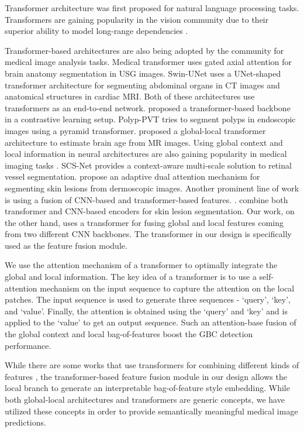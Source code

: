 %
Transformer architecture was first proposed \cite{vaswani2017attention} for natural language processing tasks. Transformers are gaining popularity in the vision community due to their superior ability to model long-range dependencies \cite{dosovitskiy2020image, touvron2021training, shao2021temporal}. 
\par Transformer-based architectures are also being adopted  by the community for medical image analysis tasks. Medical transformer \cite{valanarasu2021medical} uses gated axial attention for brain anatomy segmentation in USG images. Swin-UNet \cite{cao2021swin} uses a UNet-shaped transformer architecture for segmenting abdominal organs in CT images and anatomical structures in cardiac MRI. Both of these architectures use transformers as an end-to-end network. \cite{wang2022transformer} proposed a transformer-based backbone in a contrastive learning setup. Polyp-PVT \cite{dong2021polyp} tries to segment polyps in endoscopic images using a pyramid transformer. \cite{he2021global} proposed a global-local transformer architecture to estimate brain age from MR images. 
Using global context and local information in neural architectures are also gaining popularity in medical imaging tasks \cite{guo2019deep, van2021hooknet, wu2021region, wu2022cross}. SCS-Net \cite{wu2021scs} provides a context-aware multi-scale solution to retinal vessel segmentation. \cite{wu2020automated} propose an adaptive dual attention mechanism for segmenting skin lesions from dermoscopic images.
Another prominent line of work is using a fusion of CNN-based and transformer-based features. \cite{chen2021transunet, wang2021transbts}. \cite{wu2022fat} combine both transformer and CNN-based encoders for skin lesion segmentation. Our work, on the other hand, uses a transformer for fusing global and local features coming from two different CNN backbones. The transformer in our design is specifically used as the feature fusion module.
\par We use the attention mechanism of a transformer \cite{vaswani2017attention} to optimally integrate the global and local information. The key idea of a transformer is to use a self-attention mechanism on the input sequence to capture the attention on the local patches. The input sequence is used to generate three sequences - `query', `key', and `value'. Finally, the attention is obtained using the `query' and `key' and is applied to the `value' to get an output sequence. Such an attention-base fusion of the global context and local bag-of-features boost the GBC detection performance.
\par While there are some works that use transformers for combining different kinds of features \cite{xia2021effective, he2021global}, the transformer-based feature fusion module in our design allows the local branch to generate an interpretable bag-of-feature style embedding. While both global-local architectures and transformers are generic concepts, we have utilized these concepts in order to provide semantically meaningful medical image predictions. 

